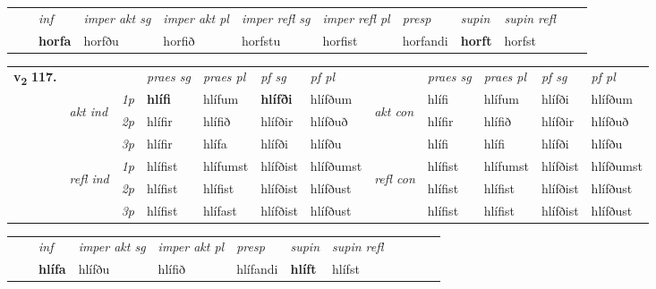 \begin{tabular}{llllllllllll}
 & & \textit{inf} & \textit{imper akt sg} & \textit{imper akt pl} & \textit{imper refl sg} & \textit{imper refl pl} & \textit{presp} & \textit{supin} & \textit{supin refl}      \\*
  & & \textbf{horfa} & horfðu  & horfið & horfstu & horfist & horfandi &  \textbf{horft} & horfst  \\*
\cmidrule{1-12}
\end{tabular}



\begin{tabular}{llllllllllll} \toprule
\multirow{4}{*}{{{\textbf{v{\textsubscript{2}}} \Large{\textbf{117.}}}}}  & &   &  \textit{praes sg}  & \textit{praes pl}  &\textit{ pf sg} & \textit{pf pl} &  &  \textit{praes sg}  & \textit{praes pl}  & \textit{pf sg} & \textit{pf pl } \\*
	\cmidrule{4-7} \cmidrule{9-12}
 & \multirow{3}{*}{\begin{turn}{90}\textit{akt ind}\end{turn}} & {\textit{1p}} & \textbf{hlífi} & hlífum    & \textbf{hlífði} & hlífðum & \multirow{3}{*}{\begin{turn}{90}\textit{akt con}\end{turn}} &hlífi & hlífum & hlífði & hlífðum\\*
& &  {\textit{2p}} &  hlífir  & hlífið   & hlífðir & hlífðuð & & hlífir & hlífið & hlífðir & hlífðuð \\*
& &  {\textit{3p}} & hlífir & hlífa   & hlífði & hlífðu & & hlífi & hlífi& hlífði & hlífðu  \\*
\cmidrule{4-7} \cmidrule{9-12}
 &\multirow{3}{*}{\begin{turn}{90}\textit{refl ind}\end{turn}} & {\textit{1p}} & hlífist & hlífumst    & hlífðist & hlífðumst & \multirow{3}{*}{\begin{turn}{90}\textit{refl con}\end{turn}}  &hlífist & hlífumst & hlífðist & hlífðumst\\*
 &&  {\textit{2p}} &  hlífist  & hlífist   & hlífðist & hlífðust & &hlífist & hlífist & hlífðist & hlífðust \\*
& &  {\textit{3p}} & hlífist & hlífast   & hlífðist & hlífðust & & hlífist & hlífist& hlífðist & hlífðust  \\*
\cmidrule{4-7} \cmidrule{9-12}
\end{tabular}


\begin{tabular}{llllllllllll}
 & & \textit{inf} & \textit{imper akt sg} & \textit{imper akt pl}   & \textit{presp} & \textit{supin} & \textit{supin refl}      \\*
  & & \textbf{hlífa} & hlífðu  & hlífið   & hlífandi &  \textbf{hlíft} & hlífst  \\*
\cmidrule{1-12}
\end{tabular}



